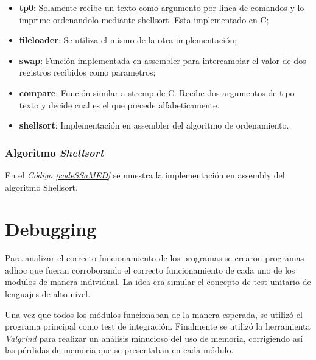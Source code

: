 \documentclass{article}
\newcommand{\refcode}[1]{\textit{Código \ref{#1}}}
\begin{document}
\begin{itemize}

\itemsep=2pt \topsep=0pt \partopsep=0pt \parskip=0pt \parsep=0pt
	\item \textbf{tp0}: Solamente recibe un texto como argumento por linea de comandos y lo imprime ordenandolo mediante shellsort. Esta implementado en C;
	\item \textbf{fileloader}: Se utiliza el mismo de la otra implementación;
	\item \textbf{swap}: Función implementada en assembler para intercambiar el valor de dos registros recibidos como parametros;
	\item \textbf{compare}: Función similar a strcmp de C. Recibe dos argumentos de tipo texto y decide cual es el que precede alfabeticamente.
	\item \textbf{shellsort}: Implementación en assembler del algoritmo de ordenamiento.

\end{itemize}	
\medskip




\subsubsection{Algoritmo \textit{Shellsort}}

	En el \refcode{codeSSaMED} se muestra la implementación en assembly del algoritmo Shellsort.

\lstset{ language = [mips]Assembler} %
 
\bigskip\bigskip\medskip




\section{Debugging}
	
	Para analizar el correcto funcionamiento de los programas se crearon programas adhoc que fueran corroborando el correcto funcionamiento de cada uno de los modulos de manera individual. La idea era simular el concepto de test unitario de lenguajes de alto nivel.
	\par
	Una vez que todos los módulos funcionaban de la manera esperada, se utilizó el programa principal como test de integración.
Finalmente se utilizó la herramienta \textit{Valgrind} para realizar un análisis minucioso del uso de memoria, corrigiendo así las pérdidas de memoria que se presentaban en cada módulo.
\bigskip
\end{document}

